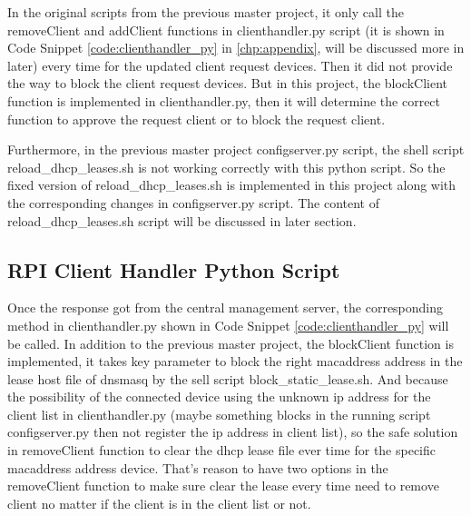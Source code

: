 \par In the original scripts from the previous master project, it only call the removeClient and addClient functions in clienthandler.py script (it is shown in Code Snippet \ref{code:clienthandler_py} in \ref{chp:appendix}, will be discussed more in later) every time for the updated client request devices. Then it did not provide the way to block the client request devices. But in this project, the blockClient function is implemented in clienthandler.py, then it will determine the correct function to approve the request client or to block the request client.
\par Furthermore, in the previous master project configserver.py script, the shell script reload\_dhcp\_leases.sh is not working correctly with this python script. So the fixed version of reload\_dhcp\_leases.sh is implemented in this project along with the corresponding changes in configserver.py script. The content of reload\_dhcp\_leases.sh script will be discussed in later section.

\subsection{RPI Client Handler Python Script}
\par Once the response got from the central management server, the corresponding method in clienthandler.py shown in Code Snippet \ref{code:clienthandler_py} will be called. In addition to the previous master project, the blockClient function is implemented, it takes key parameter to block the right \gls{macaddress} address in the lease host file of dnsmasq by the sell script block\_static\_lease.sh. And because the possibility of the connected device using the unknown \gls{ip} address for the client list in clienthandler.py (maybe something blocks in the running script configserver.py then not register the \gls{ip} address in client list), so the safe solution in removeClient function to clear the \gls{dhcp} lease file ever time for the specific \gls{macaddress} address device. That's reason to have two options in the removeClient function to make sure clear the lease every time need to remove client no matter if the client is in the client list or not.

